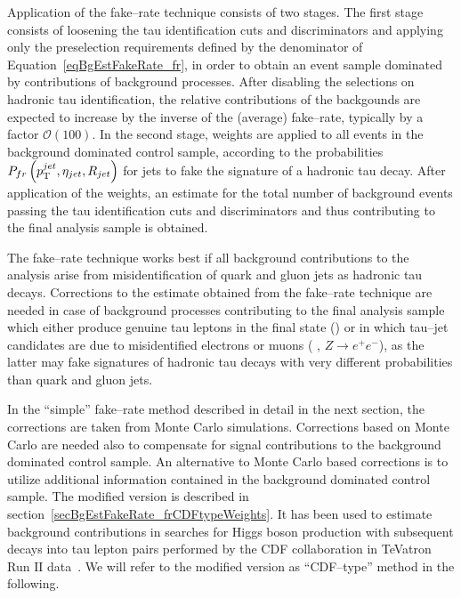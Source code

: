 Application of the fake--rate technique consists of two stages.  The first stage
consists of loosening the tau identification cuts and discriminators and
applying only the preselection requirements defined by the denominator of
Equation~\ref{eqBgEstFakeRate_fr}, in order to obtain an event sample dominated
by contributions of background processes. After disabling the selections on
hadronic tau identification, the relative contributions of the backgounds are
expected to increase by the inverse of the (average) fake--rate, typically by a
factor $\mathcal{O} \left( 100 \right)$.  In the second stage, weights are
applied to all events in the background dominated control sample, according to
the probabilities $P_{fr} \left( p_{\mathrm{T}}^{jet}, \eta_{jet}, R_{jet} \right)$ for
jets to fake the signature of a hadronic tau decay.  After application of the
weights, an estimate for the total number of background events passing the tau
identification cuts and discriminators and thus contributing to the final
analysis sample is obtained.

The fake--rate technique works best if all background contributions to the
analysis arise from misidentification of quark and gluon jets as hadronic tau
decays.  Corrections to the estimate obtained from the fake--rate technique  are
needed in case of background processes contributing to the final analysis sample
which either produce genuine tau leptons in the final state (\eg \ttbarpJets) or
in which tau--jet candidates are due to misidentified electrons or muons (\eg
\ZMM, $Z \to e^{+} e^{-}$), as the latter may fake signatures of hadronic tau
decays with very different probabilities than quark and gluon jets. 

In the ``simple'' fake--rate method described in detail in the next
section, the corrections are taken from Monte Carlo simulations.  Corrections
based on Monte Carlo are needed also to compensate for signal contributions to
the background dominated control sample.
An alternative to Monte Carlo based corrections is to utilize additional
information contained in the background dominated control sample.  The modified
version is described in section~\ref{secBgEstFakeRate_frCDFtypeWeights}.  It has
been used to estimate background contributions in searches for Higgs boson
production with subsequent decays into tau lepton pairs performed by the CDF
collaboration in TeVatron Run $\mathrm{II}$ data~\cite{CDFMSSMHiggs,
CDFFakerateDJang, CDFFakerateAlmenar}.  We will
refer to the modified version as ``CDF--type'' method in the following.


